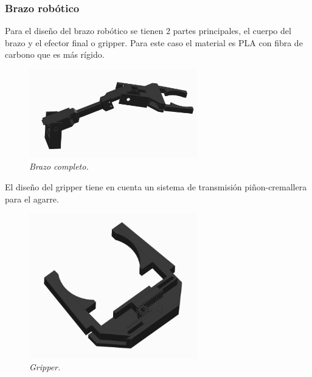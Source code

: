 \subsubsection{Brazo robótico}
Para el diseño del brazo robótico se tienen 2 partes principales, el cuerpo del brazo y el efector final o gripper. Para este caso el material es PLA con fibra de carbono que es más rígido.
\begin{figure}[H]
    \centering
\includegraphics[width=0.65\textwidth]{img/brazo_completo.jpg} \par
    \caption{\textit{Brazo completo.}}
    \label{fig:brazo_Real}
\end{figure}
El diseño del gripper tiene en cuenta un sistema de transmisión piñon-cremallera para el agarre. 
\begin{figure}[H]
    \centering
\includegraphics[width=0.65\textwidth]{img/gripper.jpg} \par
    \caption{\textit{Gripper.}}
    \label{fig:gripper_Real}
\end{figure}


